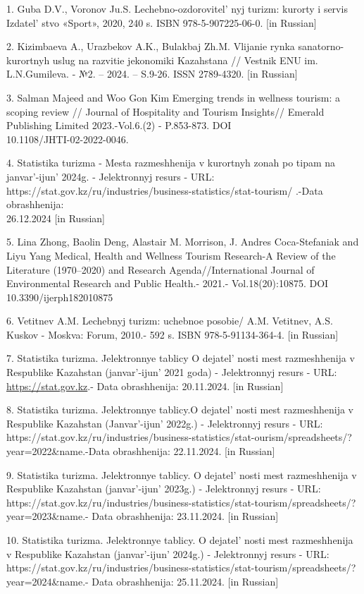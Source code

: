 \begin{references}
1. Guba D.V., Voronov Ju.S. Lechebno-ozdorovitel' nyj
turizm: kurorty i servis Izdatel' stvo «Sport», 2020, 240
s. ISBN 978-5-907225-06-0. {[}in Russian{]}

2. Kizimbaeva A., Urazbekov A.K., Bulakbaj Zh.M. Vlijanie rynka
sanatorno-kurortnyh uslug na razvitie jekonomiki Kazahstana // Vestnik
ENU im. L.N.Gumileva. - №2. -- 2024. -- S.9-26. ISSN 2789-4320. {[}in
Russian{]}

3. Salman Majeed and Woo Gon Kim Emerging trends in wellness tourism: a
scoping review // Journal of Hospitality and Tourism Insights// Emerald
Publishing Limited 2023.-Vol.6.(2) - P.853-873. DOI\\
10.1108/JHTI-02-2022-0046.

4. Statistika turizma - Mesta razmeshhenija v kurortnyh zonah po tipam
na janvar'-ijun'{} 2024g. - Jelektronnyj
resurs - URL:
https://stat.gov.kz/ru/industries/business-statistics/stat-tourism/
.-Data obrashhenija: \\26.12.2024 {[}in Russian{]}

5. Lina Zhong, Baolin Deng, Alastair M. Morrison, J. Andres
Coca-Stefaniak and Liyu Yang Medical, Health and Wellness Tourism
Research-A Review of the Literature (1970--2020) and Research
Agenda//International Journal of Environmental Research and Public
Health.- 2021.- Vol.18(20):10875. DOI 10.3390/ijerph182010875

6. Vetitnev A.M. Lechebnyj turizm: uchebnoe posobie/ A.M. Vetitnev, A.S.
Kuskov - Moskva: Forum, 2010.- 592 s. ISBN 978-5-91134-364-4. {[}in
Russian{]}

7. Statistika turizma. Jelektronnye tablicy O
dejatel' nosti mest razmeshhenija v Respublike Kazahstan
(janvar'-ijun'{} 2021 goda) - Jelektronnyj
resurs - URL:
\href{https://stat.gov.kz/ru/industries/business-statistics/stat-tourism/spreadsheets/?year=2021&name}{https://stat.gov.kz}.-
Data obrashhenija: 20.11.2024. {[}in Russian{]}

8. Statistika turizma. Jelektronnye tablicy.O
dejatel' nosti mest razmeshhenija v Respublike Kazahstan
(Janvar'-ijun'{} 2022g.) - Jelektronnyj
resurs - URL:
https://stat.gov.kz/ru/industries/business-statistics/stat-ourism/spreadsheets/?year=2022\&name.-Data
obrashhenija: 22.11.2024. {[}in Russian{]}

9. Statistika turizma. Jelektronnye tablicy. O
dejatel' nosti mest razmeshhenija v Respublike Kazahstan
(janvar'-ijun'{} 2023g.) - Jelektronnyj
resurs - URL:
https://stat.gov.kz/ru/industries/business-statistics/stat-tourism/spreadsheets/?year=2023\&name.-
Data obrashhenija: 23.11.2024. {[}in Russian{]}

10. Statistika turizma. Jelektronnye tablicy. O
dejatel' nosti mest razmeshhenija v Respublike Kazahstan
(janvar'-ijun'{} 2024g.) - Jelektronnyj
resurs - URL:
https://stat.gov.kz/ru/industries/business-statistics/stat-tourism/spreadsheets/?year=2024\&name.-
Data obrashhenija: 25.11.2024. {[}in Russian{]}
\end{references}

